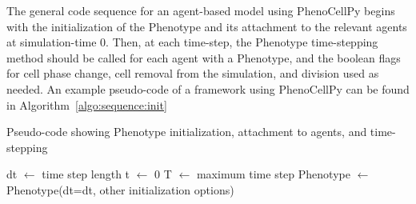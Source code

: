 The general code sequence for an agent-based model using PhenoCellPy begins with the initialization of the Phenotype and its attachment to the relevant agents at simulation-time 0. Then, at each time-step, the Phenotype time-stepping method should be called for each agent with a Phenotype, and the boolean flags for cell phase change, cell removal from the simulation, and division used as needed. An example pseudo-code of a framework using PhenoCellPy can be found in Algorithm~\ref{algo:sequence:init}


\begin{algorithm}[H]
\SetAlgoLined
    \caption{Pseudo-code showing Phenotype initialization, attachment to agents, and time-stepping}\label{algo:sequence:init}
    dt $\gets$ time step length\;
    t $\gets$ 0\;
    T $\gets$ maximum time step\;
    Phenotype $\gets$ Phenotype(dt=dt, other initialization options)\;
    
\end{algorithm}

